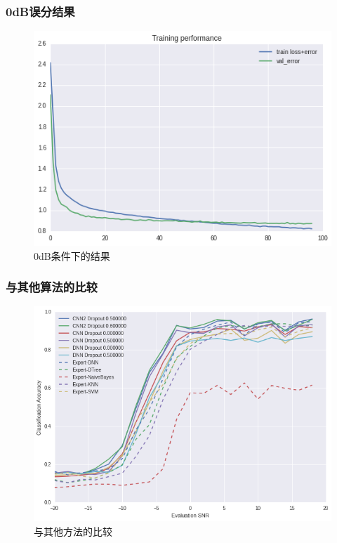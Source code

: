 \subsubsection{0dB误分结果}
\begin{figure}[!h]
	\centering
	\includegraphics[scale=0.6]{figures/chapter_3/loss}
	\caption{0dB条件下的结果}	\label{sec:fig_3_10}
\end{figure}

\subsubsection{与其他算法的比较}
\begin{figure}[!h]
	\centering
	\includegraphics[scale=0.6]{figures/chapter_3/fig_3_11}
	\caption{与其他方法的比较}	\label{sec:fig_3_11}
\end{figure}


